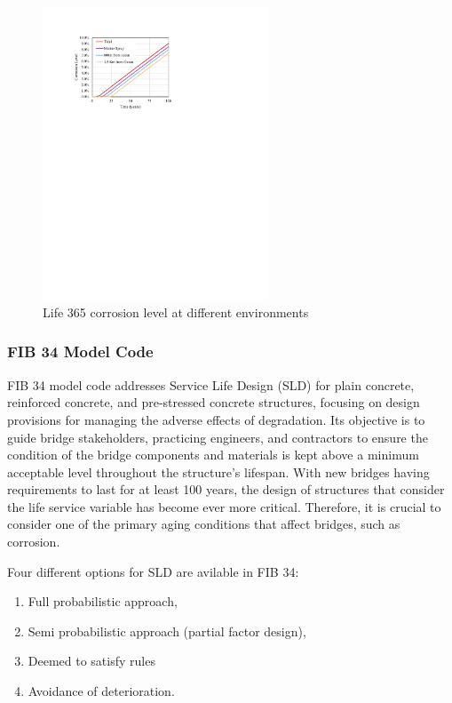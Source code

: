 \begin{figure}[htbp]
	\centering
	\includegraphics[width=0.6\textwidth]{VAC Thesis 2.0/Chapter-6/figs/Life365.pdf}
	\caption{Life 365 corrosion level at different environments}
	\label{fig:Life_365_example}
\end{figure}
\subsubsection{FIB 34 Model Code}
FIB 34 model code addresses Service Life Design (SLD) for plain concrete, reinforced concrete, and pre-stressed concrete structures, focusing on design provisions for managing the adverse effects of degradation. Its objective is to guide bridge stakeholders, practicing engineers, and contractors to ensure the condition of the bridge components and materials is kept above a minimum acceptable level throughout the structure's lifespan. With new bridges having requirements to last for at least 100 years, the design of structures that consider the life service variable has become ever more critical. Therefore, it is crucial to consider one of the primary aging conditions that affect bridges, such as corrosion.

Four different options for SLD are avilable in FIB 34:
\begin{enumerate}
    \item Full probabilistic approach,
    \item Semi probabilistic approach (partial factor design),
    \item Deemed to satisfy rules
    \item Avoidance of deterioration.
\end{enumerate}

